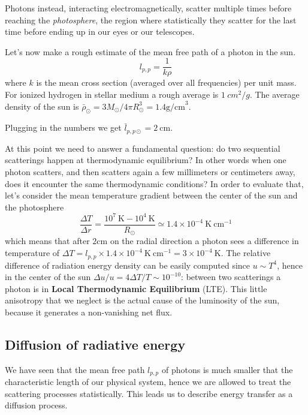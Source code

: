 Photons instead, interacting electromagnetically, scatter multiple times before reaching the \textit{photosphere}, the region where statistically they scatter for the last time before ending up in our eyes or our telescopes. 

Let's now make a rough estimate of the mean free path of a photon in the sun. 
\begin{equation}\label{mfp}
	l_{p,p}=\frac{1}{k \rho}
\end{equation}
where $k$ is the mean cross section (averaged over all frequencies) per unit mass. For ionized hydrogen in stellar medium a rough average is $1 \ cm^2/g$. The average density of the sun is $\bar\rho_{\odot}=3M_{\odot}/4 \pi R_{\odot}^3= 1.4 \mathrm{g /cm}^3$. 

Plugging in the numbers we get $\bar l_{p,p \odot}=2 \  \mathrm{cm}$. 

At this point we need to answer a fundamental question: do two sequential scatterings happen at thermodynamic equilibrium? In other words when one photon scatters, and then scatters again a few millimeters or centimeters away, does it encounter the same thermodynamic conditions? In order to evaluate that, let's consider the mean temperature gradient between the center of the sun and the photosphere
$$
\frac{\Delta T}{\Delta r} = \frac{10^7 \ \mathrm{K}-10^4  \ \mathrm{K}}{R_{\odot}} \simeq 1.4 \times 10^{-4} \  \mathrm{K} \ \mathrm{cm} ^{-1}
$$
which means that after $2 \mathrm{cm}$ on the radial direction a photon sees a difference in temperature of $\Delta T = l_{p,p} \times 1.4 \times 10^{-4}  \  \mathrm{K} \ \mathrm{cm} ^{-1}= 3 \times 10^{-4} \  \mathrm{K}$. The relative difference of radiation energy density can be easily computed since $u \sim T^4$, hence in the center of the sun $\Delta u/u=4 \Delta T / T \sim 10^{-10}$: between two scatterings a photon is in \textbf{Local Thermodynamic Equilibrium} (LTE). This little anisotropy that we neglect is the actual cause of the luminosity of the sun, because it generates a non-vanishing net flux.
\subsection{Diffusion of radiative energy}
We have seen that the mean free path $l_{p,p}$ of photons is much smaller that the characteristic length of our physical system, hence we are allowed to treat the scattering processes statistically. This leads us to describe energy transfer as a diffusion process. 

